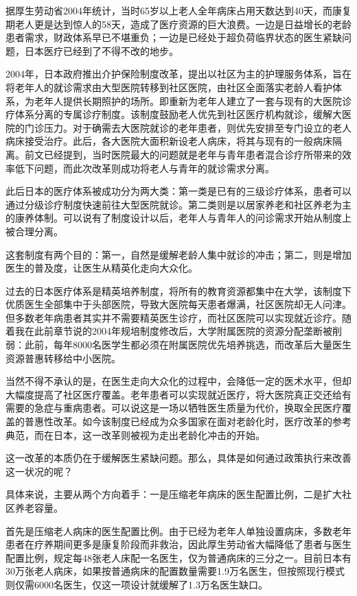 据厚生劳动省2004年统计，当时65岁以上老人全年病床占用天数达到40天，而康复期老人更是达到惊人的58天，造成了医疗资源的巨大浪费。一边是日益增长的老龄患者需求，财政体系早已不堪重负；一边是已经处于超负荷临界状态的医生紧缺问题，日本医疗已经到了不得不改的地步。

2004年，日本政府推出介护保险制度改革，提出以社区为主的护理服务体系，旨在将老年人的就诊需求由大型医院转移到社区医院，由社区全面落实老龄人看护体系，为老年人提供长期照护的场所。即重新为老年人建立了一套与现有的大医院诊疗体系分离的专属诊疗制度。该制度鼓励老人优先到社区医疗机构就诊，缓解大医院的门诊压力。对于确需去大医院就诊的老年患者，则优先安排至专门设立的老人病床接受治疗。此后，各大医院大面积新设老人病床，将其与现有的一般病床隔离。前文已经提到，当时医院最大的问题就是老年与青年患者混合诊疗所带来的效率低下问题，而此次改革则成功将老人与青年的就诊需求分离。

此后日本的医疗体系被成功分为两大类：第一类是已有的三级诊疗体系，患者可以通过分级诊疗制度快速前往大型医院就诊。第二类则是以居家养老和社区养老为主的康养体制。可以说有了制度设计以后，老年人与青年人的问诊需求开始从制度上被合理分离。

这套制度有两个目的：第一，自然是缓解老龄人集中就诊的冲击；第二，则是增加医生的普及度，让医生从精英化走向大众化。

过去的日本医疗体系是精英培养制度，将所有的教育资源都集中在大学，该制度下优质医生全部集中于头部医院，导致大医院每天患者爆满，社区医院却无人问津。但多数老年病患者其实并不需要精英医生诊疗，而社区医院可以实现就近诊疗。随着我在此前章节说的2004年规培制度修改后，大学附属医院的资源分配垄断被削弱：此前，每年8000名医学生都必须在附属医院优先培养挑选，而改革后大量医生资源普惠转移给中小医院。

当然不得不承认的是，在医生走向大众化的过程中，会降低一定的医术水平，但却大幅度提高了社区医疗覆盖。老年患者可以实现就近医疗，将大医院真正交还给有需要的急症与重病患者。可以说这是一场以牺牲医生质量为代价，换取全民医疗覆盖的普惠性改革。如今该制度已经成为众多国家在面对老龄化时，医疗改革的参考典范，而在日本，这一改革则被视为走出老龄化冲击的开始。

这一改革的本质仍在于缓解医生紧缺问题。那么，具体是如何通过政策执行来改善这一状况的呢？

具体来说，主要从两个方向着手：一是压缩老年病床的医生配置比例，二是扩大社区养老容量。

首先是压缩老人病床的医生配置比例。由于已经为老年人单独设置病床，多数老年患者在疗养期间更多是康复阶段而非救治，因此厚生劳动省大幅降低了患者与医生配置比例，规定每48张老人床配一名医生，仅为普通病床的三分之一。目前日本有30万张老人病床，如果按普通病床的配置数量需要1.9万名医生，但按照现行模式则仅需6000名医生，仅这一项设计就缓解了1.3万名医生缺口。


